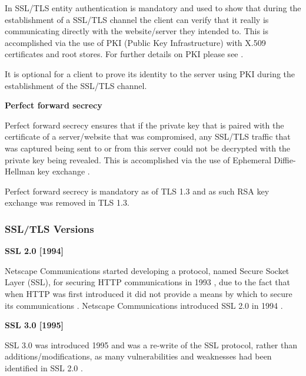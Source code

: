 \documentclass{mscreport}
\begin{document}
\vspace{0.3cm} \noindent
In SSL/TLS entity authentication is mandatory and used to show that during the establishment of a SSL/TLS channel the client can verify that it really is communicating directly with the website/server they intended to. This is accomplished via the use of PKI (Public Key Infrastructure) with X.509 certificates and root stores. For further details on PKI please see \cite{Clark2013-sh,Holz2011-yv}.

\vspace{0.3cm} \noindent
It is optional for a client to prove its identity to the server using PKI during the establishment of the SSL/TLS channel.

\vspace{0.7cm} \noindent
\textbf{Perfect forward secrecy}

\noindent
Perfect forward secrecy ensures that if the private key that is paired with the certificate of a server/website that was compromised, any SSL/TLS traffic that was captured being sent to or from this server could not be decrypted with the private key being revealed. This is accomplished via the use of Ephemeral Diffie-Hellman key exchange \cite{Martin2017-sx}.

\vspace{0.3cm} \noindent
Perfect forward secrecy is mandatory as of TLS 1.3 and as such RSA key exchange was removed in TLS 1.3.

\subsubsection{SSL/TLS Versions}
\textbf{SSL 2.0 [1994]}

\noindent
Netscape Communications started developing a protocol, named Secure Socket Layer (SSL), for securing HTTP communications in 1993 \cite{Oppliger2016-ig}, due to the fact that when HTTP was first introduced it did not provide a means by which to secure its communications \cite{Oppliger2016-ig}.
Netscape Communications introduced SSL 2.0 in 1994 \cite{Oppliger2016-ig,Wu2016-nx}.

\vspace{0.7cm} \noindent
\textbf{SSL 3.0 [1995]}

\noindent
SSL 3.0 was introduced 1995 \cite{Ristic2017-aj,Oppliger2016-ig} and was a re-write of the SSL protocol, rather than additions/modifications, as many vulnerabilities and weaknesses had been identified in SSL 2.0 \cite{Ristic2017-aj,Wagner1996-fx}.
\end{document}
